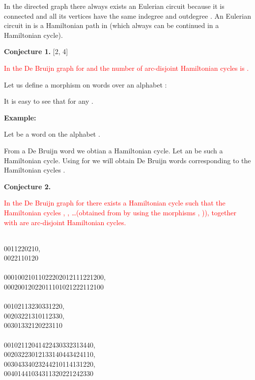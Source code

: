 \documentclass[10pt]{article}
\begin{document}
\medskip\noindent 
In the directed graph  there always exists an Eulerian circuit because
it is connected and  all its
vertices have the same indegree and outdegree . An Eulerian
circuit in   is a Hamiltonian path in  (which always can
be continued in a Hamiltonian cycle).		 



\medskip\noindent\textbf{{Conjecture 1.}} [2, 4]

\noindent\textcolor{red}{In the De Bruijn graph  for  and  the number of arc-disjoint Hamiltonian cycles is .}

\medskip\noindent
Let us define a morphism  on words over an alphabet :

It is easy to see that  for any .

\medskip\noindent\textbf{Example:} 

Let be a word  on the alphabet .

 



\medskip\noindent
From a De Bruijn word we obtian a Hamiltonian cycle. Let an  be such a Hamiltonian cycle. Using  for  we will obtain De Bruijn words corresponding to the Hamiltonian cycles . 


 
\medskip\noindent\textbf{{Conjecture 2.}}

\noindent\textcolor{red}{In the De Bruijn graph  for {} there exists a Hamiltonian cycle {} such that the Hamiltonian cycles  , , \ldots  (obtained from {} by using the morphisms , )), together with  are  arc-disjoint Hamiltonian cycles.}


\medskip\noindent 
{}\\
 {0011220210}, \\   {0022110120}\\
{} \\
 {00010021011022202012111221200}, \\
 {00020012022011101021222112100}
\\
{}\\   {00102113230331220}, \\ 
 {00203221310112330}, \\
 {00301332120223110}  
\\
{} \\
  {00102112041422430332313440},\\  
 {00203223012133140443424110},  \\
  {00304334023244210114131220}, \\
  {00401441034311320221242330}
\end{document}
